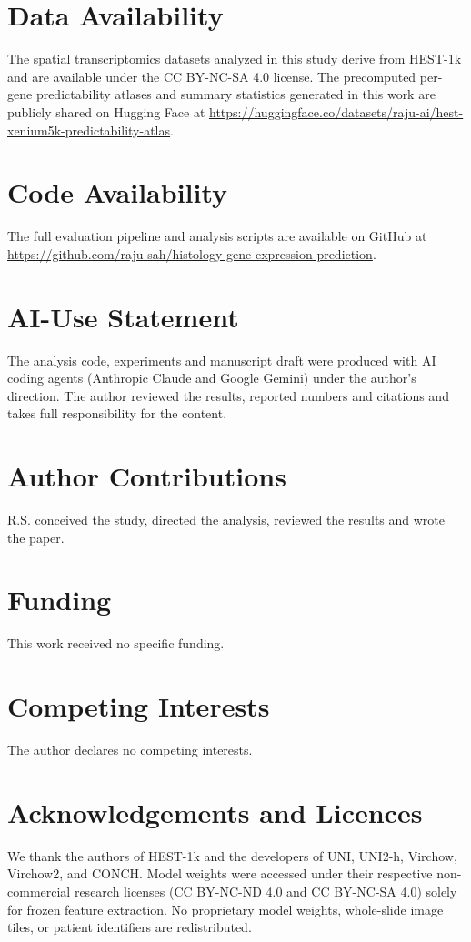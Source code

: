 \documentclass[10pt,twocolumn]{article}
\begin{document}
\section*{Data Availability}
The spatial transcriptomics datasets analyzed in this study derive from HEST-1k \citep{jaume2024hest} and are available under the CC BY-NC-SA 4.0 license. The precomputed per-gene predictability atlases and summary statistics generated in this work are publicly shared on Hugging Face at \url{https://huggingface.co/datasets/raju-ai/hest-xenium5k-predictability-atlas}.

\section*{Code Availability}
The full evaluation pipeline and analysis scripts are available on GitHub at \url{https://github.com/raju-sah/histology-gene-expression-prediction}.

\section*{AI-Use Statement}
The analysis code, experiments and manuscript draft were produced with AI coding agents (Anthropic Claude and Google Gemini) under the author's direction. The author reviewed the results, reported numbers and citations and takes full responsibility for the content.

\section*{Author Contributions}
R.S. conceived the study, directed the analysis, reviewed the results and wrote the paper.

\section*{Funding}
This work received no specific funding.

\section*{Competing Interests}
The author declares no competing interests.

\section*{Acknowledgements and Licences}
We thank the authors of HEST-1k \citep{jaume2024hest} and the developers of UNI, UNI2-h, Virchow, Virchow2, and CONCH. Model weights were accessed under their respective non-commercial research licenses (CC BY-NC-ND 4.0 and CC BY-NC-SA 4.0) solely for frozen feature extraction. No proprietary model weights, whole-slide image tiles, or patient identifiers are redistributed.



\end{document}
